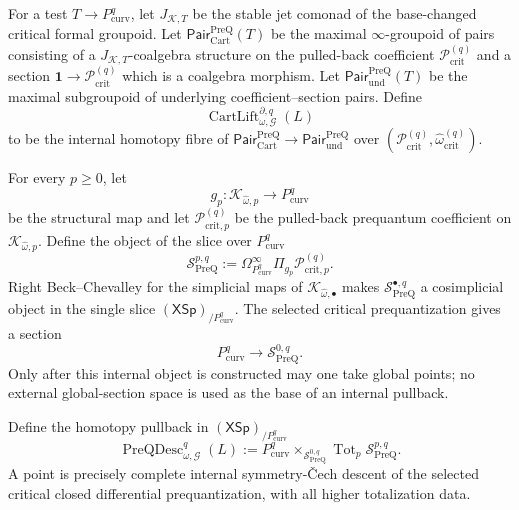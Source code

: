 \begin{definition}
\label{def:prequantum-cartan-lift-realization}
For a test $T\to P_{\mathrm{curv}}^q$, let
$J_{\mathcal K,T}$ be the stable jet comonad of the base-changed critical formal
groupoid.  Let $\mathsf{Pair}^{\mathrm{PreQ}}_{\mathrm{Cart}}(T)$ be the maximal
$\infty$-groupoid of pairs consisting of a
$J_{\mathcal K,T}$-coalgebra structure on the pulled-back coefficient
$\mathscr P_{\mathrm{crit}}^{(q)}$ and a section
$\mathbf1\to\mathscr P_{\mathrm{crit}}^{(q)}$ which is a coalgebra morphism.  Let
$\mathsf{Pair}^{\mathrm{PreQ}}_{\mathrm{und}}(T)$ be the maximal subgroupoid of
underlying coefficient--section pairs.  Define
\[
\boxed{
\operatorname{CartLift}^{\partial,q}_{\omega,\mathcal G}(L)
}
\]
to be the internal homotopy fibre of
$\mathsf{Pair}^{\mathrm{PreQ}}_{\mathrm{Cart}}\to
\mathsf{Pair}^{\mathrm{PreQ}}_{\mathrm{und}}$ over
$(\mathscr P_{\mathrm{crit}}^{(q)},
\widehat\omega_{\mathrm{crit}}^{(q)})$.
\end{definition}

\begin{construction}
\label{constr:prequantum-cosimplicial-section-object}
For every $p\ge0$, let
\[
g_p:\mathcal K_{\widehat\omega,p}\longrightarrow P_{\mathrm{curv}}^q
\]
be the structural map and let
$\mathscr P_{\mathrm{crit},p}^{(q)}$ be the pulled-back prequantum coefficient on
$\mathcal K_{\widehat\omega,p}$.  Define the object of the slice over
$P_{\mathrm{curv}}^q$
\[
\boxed{
\mathscr S_{\mathrm{PreQ}}^{p,q}
:=
\Omega_{P_{\mathrm{curv}}^q}^\infty
\Pi_{g_p}\mathscr P_{\mathrm{crit},p}^{(q)}.
}
\]
Right Beck--Chevalley for the simplicial maps of
$\mathcal K_{\widehat\omega,\bullet}$ makes
$\mathscr S_{\mathrm{PreQ}}^{\bullet,q}$ a cosimplicial object in the single
slice $(\mathsf{XSp})_{/P_{\mathrm{curv}}^q}$.  The selected critical
prequantization gives a section
\[
P_{\mathrm{curv}}^q\longrightarrow
\mathscr S_{\mathrm{PreQ}}^{0,q}.
\]
Only after this internal object is constructed may one take global points; no
external global-section space is used as the base of an internal pullback.
\end{construction}

\begin{definition}
\label{def:prequantum-complete-descent-realization}
Define the homotopy pullback in
$(\mathsf{XSp})_{/P_{\mathrm{curv}}^q}$
\[
\boxed{
\operatorname{PreQDesc}_{\omega,\mathcal G}^{q}(L)
:=
P_{\mathrm{curv}}^q
\times_{\mathscr S_{\mathrm{PreQ}}^{0,q}}
\operatorname{Tot}_{p}
\mathscr S_{\mathrm{PreQ}}^{p,q}.
}
\]
A point is precisely complete internal symmetry-\v{C}ech descent of the selected
critical closed differential prequantization, with all higher totalization data.
\end{definition}

